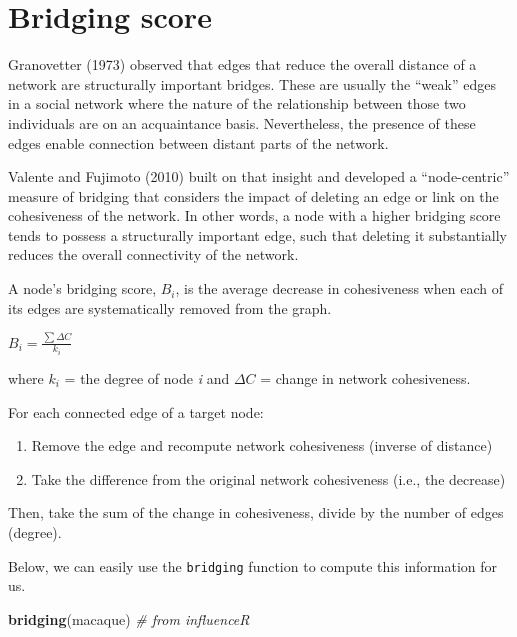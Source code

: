 \documentclass[
]{book}
\newenvironment{Shaded}{\begin{snugshade}}{\end{snugshade}}
\newcommand{\CommentTok}[1]{\textcolor[rgb]{0.56,0.35,0.01}{\textit{#1}}}
\newcommand{\FunctionTok}[1]{\textcolor[rgb]{0.13,0.29,0.53}{\textbf{#1}}}
\newcommand{\NormalTok}[1]{#1}
\providecommand{\tightlist}{%
  \setlength{\itemsep}{0pt}\setlength{\parskip}{0pt}}
\begin{document}
\section{Bridging score}\label{bridging-score}

Granovetter (1973) observed that edges that reduce the overall distance of a network are structurally important bridges. These are usually the ``weak'' edges in a social network where the nature of the relationship between those two individuals are on an acquaintance basis. Nevertheless, the presence of these edges enable connection between distant parts of the network.

Valente and Fujimoto (2010) built on that insight and developed a ``node-centric'' measure of bridging that considers the impact of deleting an edge or link on the cohesiveness of the network. In other words, a node with a higher bridging score tends to possess a structurally important edge, such that deleting it substantially reduces the overall connectivity of the network.

A node's bridging score, \(B_i\), is the average decrease in cohesiveness when each of its edges are systematically removed from the graph.

\(B_i=\frac{∑ΔC}{k_i}\)

where \(k_i\) = the degree of node \emph{i} and \(ΔC\) = change in network cohesiveness.

For each connected edge of a target node:

\begin{enumerate}
\def\labelenumi{\arabic{enumi}.}
\tightlist
\item
  Remove the edge and recompute network cohesiveness (inverse of distance)
\item
  Take the difference from the original network cohesiveness (i.e., the decrease)
\end{enumerate}

Then, take the sum of the change in cohesiveness, divide by the number of edges (degree).

Below, we can easily use the \texttt{bridging} function to compute this information for us.

\begin{Shaded}
\begin{Highlighting}[]
\FunctionTok{bridging}\NormalTok{(macaque) }\CommentTok{\# from influenceR}
\end{Highlighting}
\end{Shaded}
\end{document}
